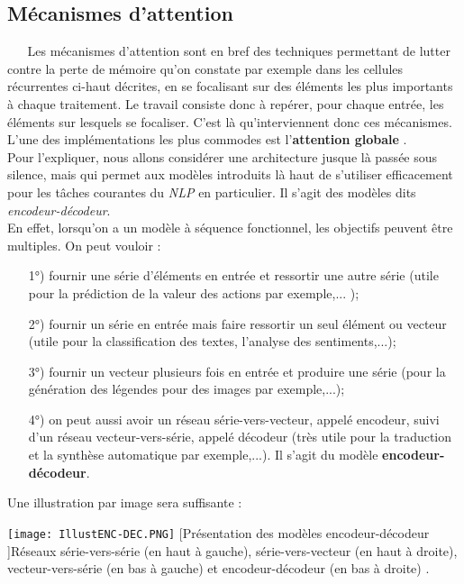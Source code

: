 \subsection{Mécanismes d'attention}\label{AttentionEtseq2seq}
$ _{} $ $ _{} $ $ _{} $ $ _{} $ $ _{} $Les mécanismes d'attention sont en bref des techniques permettant de lutter contre la perte de mémoire qu'on constate par exemple dans les cellules récurrentes ci-haut décrites, en se focalisant sur des éléments les plus importants à chaque traitement. Le travail consiste donc à repérer, pour chaque entrée, les éléments sur lesquels se focaliser. C'est là qu'interviennent donc ces mécanismes.\\
L'une des implémentations les plus commodes est l'\textbf{attention globale} \cite{luong2015effective}.\\
Pour l'expliquer, nous allons considérer une architecture jusque là passée sous silence, mais qui permet aux modèles introduits là haut de s'utiliser efficacement pour les tâches courantes du \textit{NLP} en particulier. Il s'agit des modèles dits \textit{encodeur-décodeur}.\\
En effet, lorsqu'on a un modèle à séquence fonctionnel, les objectifs peuvent être multiples. On peut vouloir :
\begin{itemize}
\item[1°)] fournir une série d'éléments en entrée et ressortir une autre série (utile pour la prédiction de la valeur des actions par exemple,... );
\item[2°)] fournir un série en entrée mais faire ressortir un seul élément ou vecteur (utile pour la classification des textes, l'analyse des sentiments,...);
\item[3°)] fournir un vecteur plusieurs fois en entrée et produire une série (pour la génération des légendes pour des images par exemple,...);
\item[4°)] on peut aussi avoir un réseau série-vers-vecteur, appelé encodeur, suivi d'un réseau 
vecteur-vers-série, appelé décodeur (très utile pour la traduction et la synthèse au\-to\-ma\-ti\-que par exemple,...). Il s'agit du modèle \textbf{encodeur-décodeur}.
\end{itemize}
Une illustration par image sera suffisante :
\begin{center}
\texttt{[image: IllustENC-DEC.PNG]}
[Présentation des modèles encodeur-décodeur \cite{geron2020deep}]{Réseaux série-vers-série (en haut à gauche), série-vers-vecteur (en haut à droite), vecteur-vers-série (en bas à gauche) et encodeur-décodeur (en bas à droite) \cite{geron2020deep}}. \label{FigureSeq2Seq}
\end{center}
